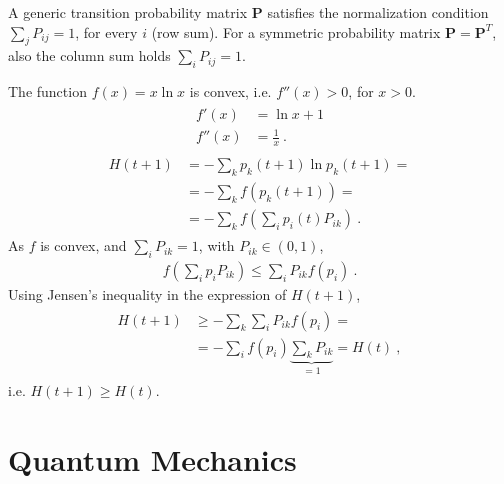 \documentclass[letterpaper,10pt,english]{jupyterBook}
\begin{document}
\sphinxAtStartPar
{} A generic transition probability matrix \(\mathbf{P}\) satisfies the normalization condition \(\sum_j P_{ij} = 1\), for every \(i\) (row sum). For a symmetric probability matrix \(\mathbf{P} = \mathbf{P}^T\), also the column sum holds \(\sum_i P_{ij} = 1\).

\sphinxAtStartPar
{} The function \(f(x) = x \ln x\) is convex, i.e. \(f''(x) > 0\), for \(x > 0\).
\begin{equation*}
\begin{split}\begin{aligned}
  f' (x) & = \ln x + 1 \\
  f''(x) & = \frac{1}{x} \ .
\end{aligned}\end{split}
\end{equation*}\begin{equation*}
\begin{split}\begin{aligned}
  H(t+1) 
  & = - \sum_k p_k(t+1) \ln p_k(t+1) = \\
  & = - \sum_k f( p_k(t+1) ) = \\
  & = - \sum_k f \left( \sum_i p_i(t) P_{ik} \right) \ .
\end{aligned}\end{split}
\end{equation*}
\sphinxAtStartPar
{} As \(f\) is convex, and \(\sum_{i} P_{ik} = 1\), with \(P_{ik} \in (0,1)\),
\begin{equation*}
\begin{split}f \left( \sum_i p_i P_{ik}  \right) \le \sum_i P_{ik} f( p_i ) \ .\end{split}
\end{equation*}
\sphinxAtStartPar
Using Jensen’s inequality in the expression of \(H(t+1)\),
\begin{equation*}
\begin{split}\begin{aligned}
H(t+1)
 & \ge - \sum_k \sum_i P_{ik} f(p_i) = \\
 & = - \sum_i f(p_i) \underbrace{\sum_k P_{ik}}_{=1} 
   = H(t) \ ,
\end{aligned}\end{split}
\end{equation*}
\sphinxAtStartPar
i.e. \(H(t+1) \ge H(t)\).

\sphinxstepscope


\part{Quantum Mechanics}
\end{document}
